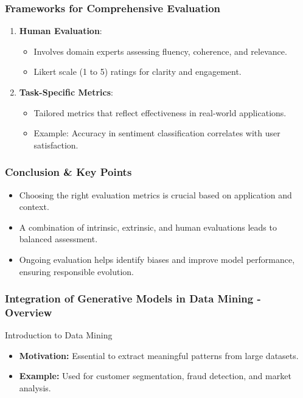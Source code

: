 \documentclass[aspectratio=169]{beamer}
\begin{document}
\begin{frame}[fragile]
    \frametitle{Frameworks for Comprehensive Evaluation}
    \begin{enumerate}
        \item \textbf{Human Evaluation}:
            \begin{itemize}
                \item Involves domain experts assessing fluency, coherence, and relevance.
                \item Likert scale (1 to 5) ratings for clarity and engagement.
            \end{itemize}
        
        \item \textbf{Task-Specific Metrics}:
            \begin{itemize}
                \item Tailored metrics that reflect effectiveness in real-world applications.
                \item Example: Accuracy in sentiment classification correlates with user satisfaction.
            \end{itemize}
    \end{enumerate}
\end{frame}

\begin{frame}[fragile]
    \frametitle{Conclusion & Key Points}
    \begin{itemize}
        \item Choosing the right evaluation metrics is crucial based on application and context.
        \item A combination of intrinsic, extrinsic, and human evaluations leads to balanced assessment.
        \item Ongoing evaluation helps identify biases and improve model performance, ensuring responsible evolution.
    \end{itemize}
\end{frame}

\begin{frame}[fragile]
    \frametitle{Integration of Generative Models in Data Mining - Overview}
    \begin{block}{Introduction to Data Mining}
        \begin{itemize}
            \item \textbf{Motivation:} Essential to extract meaningful patterns from large datasets.
            \item \textbf{Example:} Used for customer segmentation, fraud detection, and market analysis.
        \end{itemize}
    \end{block}
\end{frame}
\end{document}
